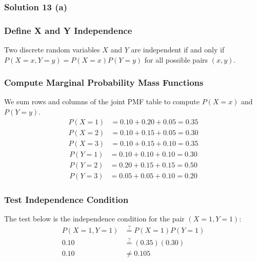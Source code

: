 \documentclass{article}
\begin{document}
\subsubsection*{Solution  13 (a)}
\subsubsection*{Define X and Y Independence}
\parbox{\textwidth}{
Two discrete random variables $X$ and $Y$ are independent if and only if $P(X=x, Y=y) = P(X=x)P(Y=y)$ for all possible pairs $(x, y)$.
\subsubsection*{Compute Marginal Probability Mass Functions}


 We sum rows and columns of the joint PMF table to compute $P(X=x)$ and $P(Y=y)$.
\begin{align*}
    P(X=1) &= 0.10 + 0.20 + 0.05 = 0.35 \\
    P(X=2) &= 0.10 + 0.15 + 0.05 = 0.30 \\
    P(X=3) &= 0.10 + 0.15 + 0.10 = 0.35
\end{align*}
\begin{align*}
    P(Y=1) &= 0.10 + 0.10 + 0.10 = 0.30 \\
    P(Y=2) &= 0.20 + 0.15 + 0.15 = 0.50 \\
    P(Y=3) &= 0.05 + 0.05 + 0.10 = 0.20
\end{align*}
}
\vspace{1em}
\subsubsection*{Test Independence Condition}
The test below is the independence condition for the pair $(X=1, Y=1)$:
\begin{align*}
    P(X=1, Y=1) &\stackrel{?}{=} P(X=1)P(Y=1) \\
    0.10 &\stackrel{?}{=} (0.35)(0.30) \\
    0.10 &\neq 0.105
\end{align*}

\subsubsection*{}
\end{document}
